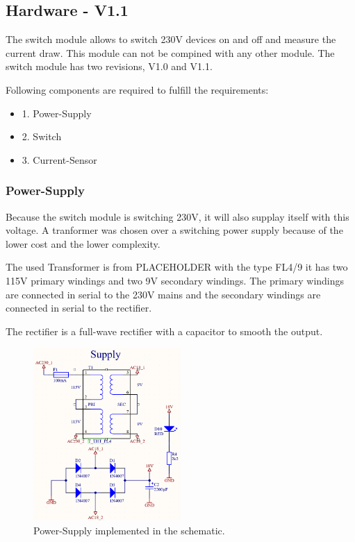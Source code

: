 \subsection{Hardware - V1.1}

    The switch module allows to switch 230V devices on and off and measure the current draw. 
    This module can not be compined with any other module. The switch module has two revisions,
    V1.0 and V1.1.

    Following components are required to fulfill the requirements:

    \begin{itemize}
        \item 1. Power-Supply
        \item 2. Switch
        \item 3. Current-Sensor
     
    \end{itemize}

    \subsubsection{Power-Supply}

        Because the switch module is switching 230V, it will also supplay itself with this voltage.
        A tranformer was chosen over a switching power supply because of the lower cost and the
        lower complexity.

        The used Transformer is from PLACEHOLDER with the type FL4/9 it has two 115V primary windings and
        two 9V secondary windings. The primary windings are connected in serial to the 230V mains and the
        secondary windings are connected in serial to the rectifier.

        The rectifier is a full-wave rectifier with a capacitor to smooth the output.

        \begin{figure}[H]
            \centering
            \includegraphics[width=0.5\textwidth]{assets/HW/Power-Supply-schematic.png}
            \caption{Power-Supply implemented in the schematic.}
        \end{figure}
        
